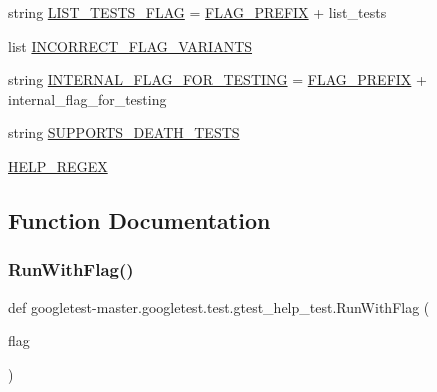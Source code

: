 \begin{DoxyCompactItemize}
\item 
string \mbox{\hyperlink{namespacegoogletest-master_1_1googletest_1_1test_1_1gtest__help__test_ac89388488288f7e8d157c6b09cb6be29}{L\+I\+S\+T\+\_\+\+T\+E\+S\+T\+S\+\_\+\+F\+L\+AG}} = \mbox{\hyperlink{namespacegoogletest-master_1_1googletest_1_1test_1_1gtest__help__test_a611edeaab6f028e090dc444b288fa411}{F\+L\+A\+G\+\_\+\+P\+R\+E\+F\+IX}} + \textquotesingle{}list\+\_\+tests\textquotesingle{}
\item 
list \mbox{\hyperlink{namespacegoogletest-master_1_1googletest_1_1test_1_1gtest__help__test_a5448289a36b46ae8920661da1f01bf20}{I\+N\+C\+O\+R\+R\+E\+C\+T\+\_\+\+F\+L\+A\+G\+\_\+\+V\+A\+R\+I\+A\+N\+TS}}
\item 
string \mbox{\hyperlink{namespacegoogletest-master_1_1googletest_1_1test_1_1gtest__help__test_a8993bf083ef0343f4283931cb1bcfded}{I\+N\+T\+E\+R\+N\+A\+L\+\_\+\+F\+L\+A\+G\+\_\+\+F\+O\+R\+\_\+\+T\+E\+S\+T\+I\+NG}} = \mbox{\hyperlink{namespacegoogletest-master_1_1googletest_1_1test_1_1gtest__help__test_a611edeaab6f028e090dc444b288fa411}{F\+L\+A\+G\+\_\+\+P\+R\+E\+F\+IX}} + \textquotesingle{}internal\+\_\+flag\+\_\+for\+\_\+testing\textquotesingle{}
\item 
string \mbox{\hyperlink{namespacegoogletest-master_1_1googletest_1_1test_1_1gtest__help__test_a6b5272f782471cf6e73d406f10409ca0}{S\+U\+P\+P\+O\+R\+T\+S\+\_\+\+D\+E\+A\+T\+H\+\_\+\+T\+E\+S\+TS}}
\item 
\mbox{\hyperlink{namespacegoogletest-master_1_1googletest_1_1test_1_1gtest__help__test_ad9f3e7aca557f6fce3491e5b9649deb8}{H\+E\+L\+P\+\_\+\+R\+E\+G\+EX}}
\end{DoxyCompactItemize}


\subsection{Function Documentation}
\mbox{\label{namespacegoogletest-master_1_1googletest_1_1test_1_1gtest__help__test_a91837c8d06174e359cbc7f0b063f478f}} 
\subsubsection{\texorpdfstring{RunWithFlag()}{RunWithFlag()}}
{\footnotesize\ttfamily def googletest-\/master.\+googletest.\+test.\+gtest\+\_\+help\+\_\+test.\+Run\+With\+Flag (\begin{DoxyParamCaption}\item[{}]{flag }\end{DoxyParamCaption})}

